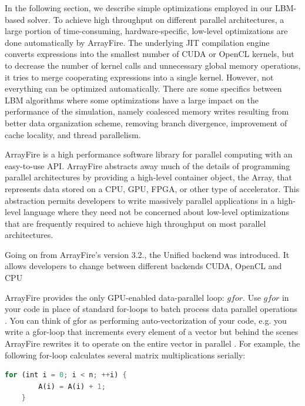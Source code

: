 In the following section, we describe simple optimizations employed in our LBM-based solver. To achieve high throughput on different parallel architectures, a large portion of time-consuming, hardware-specific, low-level optimizations are done automatically by ArrayFire. The underlying JIT compilation engine converts expressions into the smallest number of CUDA or OpenCL kernels, but to decrease the number of kernel calls and unnecessary global memory operations, it tries to merge cooperating expressions into a single kernel. However, not everything can be optimized automatically. There are some specifics between LBM algorithms where some optimizations have a large impact on the performance of the simulation, namely coalesced memory writes resulting from better data organization scheme, removing branch divergence, improvement of cache locality, and thread parallelism.

ArrayFire is a high performance software library for parallel computing with an easy-to-use API. ArrayFire abstracts away much of the details of programming parallel architectures by providing a high-level container object, the Array, that represents data stored on a CPU, GPU, FPGA, or other type of accelerator. This abstraction permits developers to write massively parallel applications in a high-level language where they need not be concerned about low-level optimizations that are frequently required to achieve high throughput on most parallel architectures.

\citep{Yalamanchili2015}

Going on from ArrayFire's version 3.2., the Unified backend was introduced. It allows developers to change between different backends CUDA, OpenCL and CPU

ArrayFire provides the only GPU-enabled data-parallel loop: $gfor$. Use $gfor$ in your code in place of standard for-loops to batch process data parallel operations \citep{malcolmArrayFireGPUAcceleration2012a}. 
You can think of gfor as performing auto-vectorization of your code, e.g. you write a gfor-loop that increments every element of a vector but behind the scenes ArrayFire rewrites it to operate on the entire vector in parallel \citep{Yalamanchili2015}. For example, the following for-loop calculates several matrix multiplications serially:

\begin{lstlisting}[language=Rust, caption=Pseudo-code with imerative for loop]
	for (int i = 0; i < n; ++i) {
		A(i) = A(i) + 1;
	}
\end{lstlisting}

